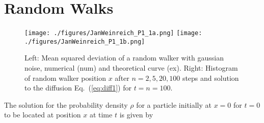 \documentclass[12pt]{article}
\date{}
\begin{document}
 
 
 
 
 
\section{Random Walks}
\begin{figure}[H]
  \centering
    \texttt{[image: ./figures/JanWeinreich\_P1\_1a.png]}
    \texttt{[image: ./figures/JanWeinreich\_P1\_1b.png]}
    \caption{Left: Mean squared deviation of a random walker with gaussian noise, 
             numerical (num) and theoretical curve (ex).  
             Right: Histogram of random walker position $x$ after $n=2, 5, 20, 100$ steps and solution to the diffusion 
             Eq.~(\ref{eq:diff1}) for $t= n=100$.}
    \label{fig:abb1}
  \end{figure}
 
 
The solution for the probability density $\rho$ for a particle
initially at $x=0$ for $t=0$ to be located at position $x$ at time $t$ is given by
 
\end{document}
